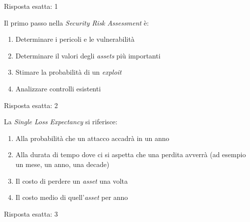 \begin{Answer} [
  ref={gestRisk2},
  number={2}
  ]

  \Question Risposta esatta: 1

\end{Answer}



\begin{Exercise} [
  title={Quiz},
  label={gestRisk3}
  ]

  \Question Il primo passo nella \textit{Security Risk Assessment} \`e:
\begin{enumerate}
 \item Determinare i pericoli e le vulnerabilit\`a
 \item Determinare il valori degli \textit{assets} pi\`u importanti
 \item Stimare la probabilit\`a di un \textit{exploit}
 \item Analizzare controlli esistenti
\end{enumerate}

\end{Exercise}


\begin{Answer} [
  ref={gestRisk3},
  number={3}
  ]

  \Question Risposta esatta: 2

\end{Answer}



\begin{Exercise} [
  title={Quiz},
  label={gestRisk4}
  ]

  \Question La \textit{Single Loss Expectancy} si riferisce:
\begin{enumerate}
 \item Alla probabilit\`a che un attacco accadr\`a in un anno
 \item Alla durata di tempo dove ci si aspetta che una perdita avverr\`a (ad
esempio un mese, un anno, una decade)
 \item Il costo di perdere un \textit{asset} una volta
 \item Il costo medio di quell'\textit{asset} per anno
\end{enumerate}

\end{Exercise}


\begin{Answer} [
  ref={gestRisk4},
  number={4}
  ]

  \Question Risposta esatta: 3

\end{Answer}


